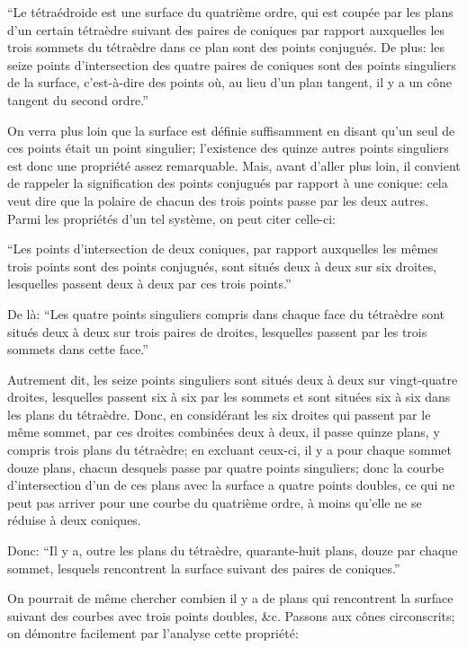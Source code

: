 \documentclass[12pt,a4paper]{article}
\begin{document}
``Le t\'etra\'edroide est une surface du quatri\`eme ordre, qui est coup\'ee par les plans d'un certain t\'etra\`edre suivant des paires de coniques par rapport auxquelles les trois sommets du t\'etra\`edre dans ce plan sont des points conjugu\'es. De plus: les seize points d'intersection des quatre paires de coniques sont des points singuliers de la surface, c'est-\`a-dire des points o\`u, au lieu d'un plan tangent, il y a un c\^one tangent du second ordre.''

On verra plus loin que la surface est d\'efinie suffisamment en disant qu'un seul de ces points \'etait un point singulier; l'existence des quinze autres points singuliers est donc une propri\'et\'e assez remarquable. Mais, avant d'aller plus loin, il convient de rappeler la signification des points conjugu\'es par rapport \`a une conique: cela veut dire que la polaire de chacun des trois points passe par les deux autres. Parmi les propri\'et\'es d'un tel syst\`eme, on peut citer celle-ci:

``Les points d'intersection de deux coniques, par rapport auxquelles les m\^emes trois points sont des points conjugu\'es, sont situ\'es deux \`a deux sur six droites, lesquelles passent deux \`a deux par ces trois points.''

De l\`a: ``Les quatre points singuliers compris dans chaque face du t\'etra\`edre sont situ\'es deux \`a deux sur trois paires de droites, lesquelles passent par les trois sommets dans cette face.''

Autrement dit, les seize points singuliers sont situ\'es deux \`a deux sur vingt-quatre droites, lesquelles passent six \`a six par les sommets et sont situ\'ees six \`a six dans les plans du t\'etra\`edre. Donc, en consid\'erant les six droites qui passent par le m\^eme sommet, par ces droites combin\'ees deux \`a deux, il passe quinze plans, y compris trois plans du t\'etra\`edre; en excluant ceux-ci, il y a pour chaque sommet douze plans, chacun desquels passe par quatre points singuliers; donc la courbe d'intersection d'un de ces plans avec la surface a quatre points doubles, ce qui ne peut pas arriver pour une courbe du quatri\`eme ordre, \`a moins qu'elle ne se r\'eduise \`a deux coniques.

Donc: ``Il y a, outre les plans du t\'etra\`edre, quarante-huit plans, douze par chaque sommet, lesquels rencontrent la surface suivant des paires de coniques.''

On pourrait de m\^eme chercher combien il y a de plans qui rencontrent la surface suivant des courbes avec trois points doubles, \&c. Passons aux c\^ones circonscrits; on d\'emontre facilement par l'analyse cette propri\'et\'e:
\end{document}
